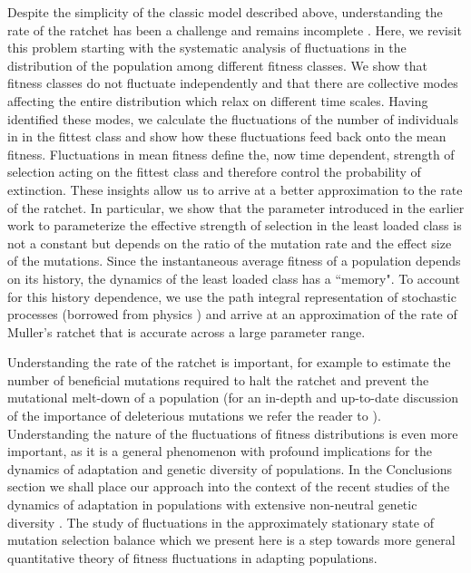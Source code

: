 \documentclass[rmp,preprint]{revtex4}
\begin{document}
Despite the simplicity of the classic model described above, understanding the rate of the ratchet has been a challenge and remains incomplete \citep{Stephan:1993p42929,Higgs:1995p45226,Gessler:1995p42788,Gordo:2000p42688,Stephan:2002_review,Etheridge:2007p44291,Jain:2008p45047,Waxman:2010p47020}. Here, we revisit this problem starting with the systematic analysis of  fluctuations in the distribution of the population among different fitness classes. We show that fitness classes do not fluctuate independently and that there are collective modes affecting the entire distribution which relax on different time scales. Having identified these modes, we calculate the fluctuations of the number of individuals in in the fittest class and show how these fluctuations feed back onto the mean fitness. Fluctuations in mean fitness define the, now time dependent, strength of selection acting on the fittest class and therefore control the probability of extinction. These insights allow us to arrive at a better approximation to the rate of the ratchet. In particular, we show that the parameter introduced in the earlier work \citep{Haigh:1978p37141,Stephan:1993p42929,Gordo:2000p42688} to parameterize the effective strength of selection in the least loaded class is not a constant but depends on the ratio of the mutation rate and the effect size of the mutations. Since the instantaneous average fitness of a population depends on its history, the dynamics of the least loaded class has a ``memory". To account for this history dependence, we use the path integral representation of stochastic processes (borrowed from physics \citep{Feynman:1965}) and arrive at an approximation of the rate of Muller's ratchet that is accurate across a large parameter range.

Understanding the rate of the ratchet is important, for example to estimate the number of beneficial mutations required to halt the ratchet and prevent the mutational melt-down of a population \citep{Lynch:1993p42844,Pfaffelhuber:2011p44301,Goyal:2011p45049} (for an in-depth and up-to-date discussion of the importance of deleterious mutations we refer the reader to \citet{Charlesworth:2012p45100}). Understanding the nature of the fluctuations of fitness distributions is even more important, as it is a general phenomenon with profound implications for the dynamics of adaptation and genetic diversity of populations. In the Conclusions section we shall place our approach into the context of the recent studies of the dynamics of adaptation in populations with extensive non-neutral genetic diversity \citep{Tsimring:1996p19688,Rouzine:2003p33590,Desai:2007p954,Neher:2010p30641}. The study of fluctuations in the approximately stationary state of mutation selection balance which we present here is a step towards more general quantitative theory of fitness fluctuations in adapting populations. 
\end{document}
